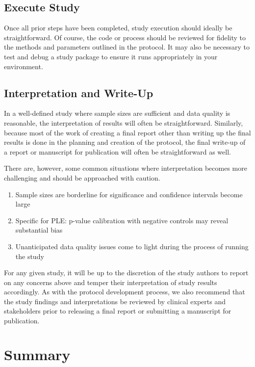 \documentclass[11pt]{book}
\providecommand{\tightlist}{%
  \setlength{\itemsep}{0pt}\setlength{\parskip}{0pt}}
\theoremstyle{definition}
\theoremstyle{definition}
\theoremstyle{definition}
\theoremstyle{remark}
\begin{document}
\subsection{Execute Study}\label{execute-study}

Once all prior steps have been completed, study execution should ideally
be straightforward. Of course, the code or process should be reviewed
for fidelity to the methods and parameters outlined in the protocol. It
may also be necessary to test and debug a study package to ensure it
runs appropriately in your environment.

\subsection{Interpretation and
Write-Up}\label{interpretation-and-write-up}

In a well-defined study where sample sizes are sufficient and data
quality is reasonable, the interpretation of results will often be
straightforward. Similarly, because most of the work of creating a final
report other than writing up the final results is done in the planning
and creation of the protocol, the final write-up of a report or
manuscript for publication will often be straightforward as well.

There are, however, some common situations where interpretation becomes
more challenging and should be approached with caution.

\begin{enumerate}
\def\labelenumi{\arabic{enumi}.}
\tightlist
\item
  Sample sizes are borderline for significance and confidence intervals
  become large
\item
  Specific for PLE: p-value calibration with negative controls may
  reveal substantial bias
\item
  Unanticipated data quality issues come to light during the process of
  running the study
\end{enumerate}

For any given study, it will be up to the discretion of the study
authors to report on any concerns above and temper their interpretation
of study results accordingly. As with the protocol development process,
we also recommend that the study findings and interpretations be
reviewed by clinical experts and stakeholders prior to releasing a final
report or submitting a manuscript for publication.

\section{Summary}\label{summary-12}
\end{document}
